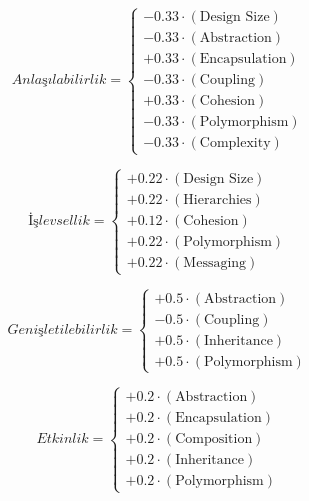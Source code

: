\documentclass[conference]{IEEEtran}
\begin{document}
\begin{equation}
	\textit{Anlaşılabilirlik} =
	\begin{cases}
		-0.33 \cdot (\text{Design Size}) \\
		-0.33 \cdot (\text{Abstraction}) \\
		+0.33 \cdot (\text{Encapsulation}) \\
		-0.33 \cdot (\text{Coupling}) \\
		+0.33 \cdot (\text{Cohesion}) \\
		-0.33 \cdot (\text{Polymorphism}) \\
		-0.33 \cdot (\text{Complexity})
	\end{cases}
	\label{equ:understandability}
\end{equation}

\begin{equation}
	\textit{İşlevsellik} =
	\begin{cases}
		+0.22 \cdot (\text{Design Size}) \\
		+0.22 \cdot (\text{Hierarchies}) \\
		+0.12 \cdot (\text{Cohesion}) \\
		+0.22 \cdot (\text{Polymorphism}) \\
		+0.22 \cdot (\text{Messaging})
	\end{cases}
	\label{equ:functionality}
\end{equation}

\begin{equation}
	\textit{Genişletilebilirlik} =
	\begin{cases}
		+0.5 \cdot (\text{Abstraction}) \\
		-0.5 \cdot (\text{Coupling}) \\
		+0.5 \cdot (\text{Inheritance}) \\
		+0.5 \cdot (\text{Polymorphism})
	\end{cases}
	\label{equ:extensibility}
\end{equation}

\begin{equation}
	\textit{Etkinlik} =
	\begin{cases}
		+0.2 \cdot (\text{Abstraction}) \\
		+0.2 \cdot (\text{Encapsulation}) \\
		+0.2 \cdot (\text{Composition}) \\
		+0.2 \cdot (\text{Inheritance}) \\
		+0.2 \cdot (\text{Polymorphism})
	\end{cases}
	\label{equ:efficiency}
\end{equation}
\end{document}
